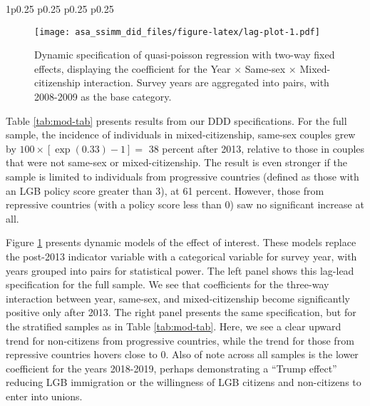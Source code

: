 \documentclass[
  11pt,
]{article}
\begin{document}
\begin{table}[ht]
\begin{centerbox}
\begin{threeparttable}
\begin{tabularx}{1\textwidth}{p{} p{} p{} p{}}
 \tabularnewline[-0.5pt]


\hhline{}
\end{tabularx}
\end{threeparttable}\par\end{centerbox}

\end{table}
 

\begin{figure}
\centering
\texttt{[image: asa\_ssimm\_did\_files/figure-latex/lag-plot-1.pdf]}
\caption{\label{fig:lag-plot}Dynamic specification of quasi-poisson regression with two-way fixed effects, displaying the coefficient for the Year × Same-sex × Mixed-citizenship interaction. Survey years are aggregated into pairs, with 2008-2009 as the base category.}
\end{figure}

Table \ref{tab:mod-tab} presents results from our DDD specifications. For the full sample, the incidence of individuals in mixed-citizenship, same-sex couples grew by \(100 \times [\exp(0.33) -1] =\) 38 percent after 2013, relative to those in couples that were not same-sex or mixed-citizenship. The result is even stronger if the sample is limited to individuals from progressive countries (defined as those with an LGB policy score greater than 3), at 61 percent. However, those from repressive countries (with a policy score less than 0) saw no significant increase at all.

Figure \ref{fig:lag-plot} presents dynamic models of the effect of interest. These models replace the post-2013 indicator variable with a categorical variable for survey year, with years grouped into pairs for statistical power. The left panel shows this lag-lead specification for the full sample. We see that coefficients for the three-way interaction between year, same-sex, and mixed-citizenship become significantly positive only after 2013. The right panel presents the same specification, but for the stratified samples as in Table \ref{tab:mod-tab}. Here, we see a clear upward trend for non-citizens from progressive countries, while the trend for those from repressive countries hovers close to 0. Also of note across all samples is the lower coefficient for the years 2018-2019, perhaps demonstrating a ``Trump effect'' reducing LGB immigration or the willingness of LGB citizens and non-citizens to enter into unions.
\end{document}
